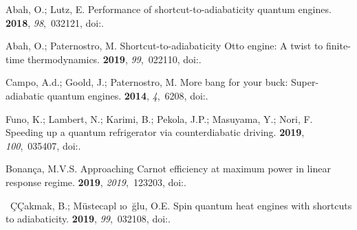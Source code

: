 \documentclass[preprints,article,accept,moreauthors,pdftex]{Definitions/mdpi}
\begin{document}
\begin{thebibliography}{999}
Abah, O.; Lutz, E.
\newblock Performance of shortcut-to-adiabaticity quantum engines.
 {\bf 2018}, {\em 98},~032121,
\linebreak
  doi:{\href{https://doi.org/10.1103/PhysRevE.98.032121}{}}.

Abah, O.; Paternostro, M.
\newblock Shortcut-to-adiabaticity {Otto} engine: A twist to finite-time
  thermodynamics.
 {\bf 2019}, {\em 99},~022110,
\newblock
  doi:{\href{https://doi.org/10.1103/PhysRevE.99.022110}{}}.

Campo, A.d.; Goold, J.; Paternostro, M.
\newblock More bang for your buck: Super-adiabatic quantum engines.
 {\bf 2014}, {\em 4},~6208,
\newblock
  doi:{\href{https://doi.org/10.1038/srep06208}{}}.

Funo, K.; Lambert, N.; Karimi, B.; Pekola, J.P.; Masuyama, Y.; Nori, F.
\newblock Speeding up a quantum refrigerator via counterdiabatic driving.
 {\bf 2019}, {\em 100},~035407,
\newblock
  doi:{\href{https://doi.org/10.1103/PhysRevB.100.035407}{}}.

Bonan{\c{c}}a, M.V.S.
\newblock Approaching {C}arnot efficiency at maximum power in linear response
  regime.
 {\bf 2019}, {\em 2019},~123203,
\newblock
  doi:{\href{https://doi.org/10.1088/1742-5468/ab4e92}{}}.

\ifmmode~\mbox{\c{C}}\else \c{C}\fi{}akmak, B.; M\"ustecapl\ifmmode
  \imath \else \i \fi{}o\ifmmode~\else \u{g}\fi{}lu, O.E.
\newblock Spin quantum heat engines with shortcuts to adiabaticity.
 {\bf 2019}, {\em 99},~032108,
\newblock
  doi:{\href{https://doi.org/10.1103/PhysRevE.99.032108}{}}.


\end{thebibliography}
\end{document}
